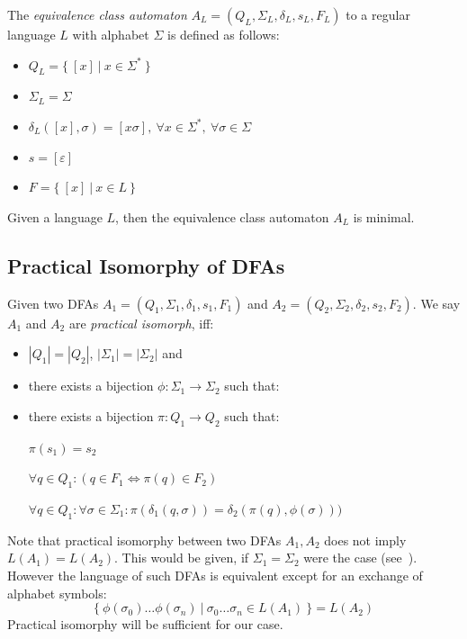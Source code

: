 The \emph{equivalence class automaton} $A_L = (Q_L, \Sigma_L, \delta_L, s_L, F_L)$ to a regular language $L$ with alphabet $\Sigma$ is defined as follows:
\begin{itemize}
	\item $Q_L = \{\ [x]\ |\ x \in \Sigma^*\ \}$
	\item $\Sigma_L = \Sigma$
	\item $\delta_L([x], \sigma) = [x\sigma],\ \forall x\in\Sigma^*,\ \forall\sigma\in\Sigma$
	\item $s = [\varepsilon]$
	\item $F = \{\ [x]\ |\ x \in L\ \}$
\end{itemize}
\begin{theorem}
	Given a language $L$, then the equivalence class automaton $A_L$ is minimal.
\end{theorem}

\subsection{Practical Isomorphy of DFAs}

Given two DFAs $A_1 = (Q_1, \Sigma_1, \delta_1, s_1, F_1)$ and $A_2 = (Q_2, \Sigma_2, \delta_2, s_2, F_2)$. We say $A_1$ and $A_2$ are \emph{practical isomorph}, iff:
\begin{itemize}
	\item $|Q_1| = |Q_2|$, $|\Sigma_1| = |\Sigma_2|$ and
	\item there exists a bijection $\phi\colon \Sigma_1 \to \Sigma_2$ such that:
	\item there exists a bijection $\pi\colon Q_1 \to Q_2$ such that:
	
	$\pi(s_1) = s_2$
	
	$\forall q\in Q_1\colon (q\in F_1 \Longleftrightarrow \pi(q)\in F_2)$
	
	$\forall q\in Q_1\colon \forall\sigma\in\Sigma_1\colon \pi(\delta_1(q,\sigma))=\delta_2(\pi(q),\phi(\sigma)))$
\end{itemize}
Note that practical isomorphy between two DFAs $A_1, A_2$ does not imply $L(A_1) = L(A_2)$. This would be given, if $\Sigma_1 = \Sigma_2$ were the case (see~\cite[p. 45]{Sch01}). However the language of such DFAs is equivalent except for an exchange of alphabet symbols:
\[
	\{\ \phi(\sigma_0)\ldots\phi(\sigma_n)\ |\ \sigma_0\ldots\sigma_n\in L(A_1)\ \} = L(A_2)
\]
Practical isomorphy will be sufficient for our case. 


